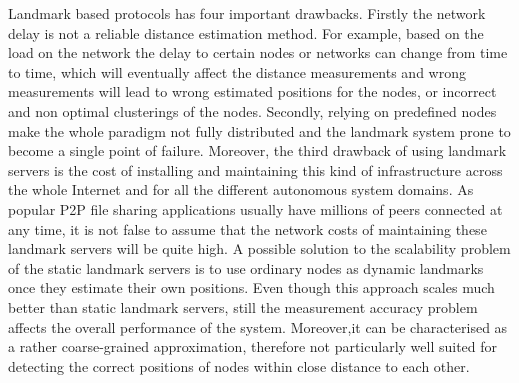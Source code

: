 Landmark based protocols has four important drawbacks. Firstly the network
delay is not a reliable distance estimation method. For example, based on the
load on the network the delay to certain nodes or networks can change from time
to time, which will eventually affect the distance measurements and wrong
measurements will lead to wrong estimated positions for the nodes, or incorrect
and non optimal clusterings of the nodes. Secondly, relying on predefined nodes
make the whole paradigm not fully distributed and the landmark system prone to
become a single point of failure. Moreover, the third drawback of using
landmark servers is the cost of installing and maintaining this kind of
infrastructure across the whole Internet and for all the different autonomous
system domains. As popular P2P file sharing applications usually have millions
of peers connected at any time, it is not false to assume that the network costs
of maintaining these landmark servers will be quite high. A possible solution to
the scalability problem of the static landmark servers is to use ordinary nodes
as dynamic landmarks once they estimate their own positions. Even though this
approach scales much better than static landmark servers, still the measurement
accuracy problem affects the overall performance of the system. Moreover,it can
be characterised as a rather coarse-grained approximation, therefore not
particularly well suited for detecting the correct positions of nodes within
close distance to each other.

